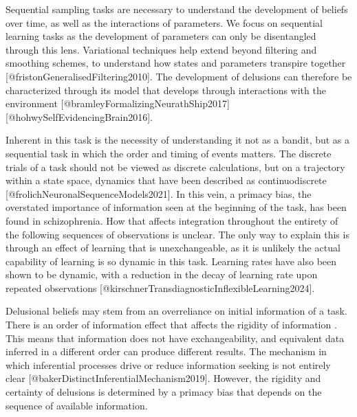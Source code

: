 \documentclass{article}
\begin{document}
Sequential sampling tasks are necessary to understand the development of beliefs over time, as well as the interactions of parameters. We focus on sequential learning tasks as the development of parameters can only be disentangled through this lens. Variational techniques help extend beyond filtering and smoothing schemes, to understand how states and parameters transpire together [@fristonGeneralisedFiltering2010]. The development of delusions can therefore be characterized through its model that develops through interactions with the environment [@bramleyFormalizingNeurathShip2017] [@hohwySelfEvidencingBrain2016].

Inherent in this task is the necessity of understanding it not as a bandit, but as a sequential task in which the order and timing of events matters. The discrete trials of a task should not be viewed as discrete calculations, but on a trajectory within a state space, dynamics that have been described as continuodiscrete [@frolichNeuronalSequenceModels2021]. In this vein, a primacy bias, the overstated importance of information seen at the beginning of the task, has been found in schizophrenia. How that affects integration throughout the entirety of the following sequences of observations is unclear. The only way to explain this is through an effect of learning that is unexchangeable, as it is unlikely the actual capability of learning is so dynamic in this task. Learning rates have also been shown to be dynamic, with a reduction in the decay of learning rate upon repeated observations [@kirschnerTransdiagnosticInflexibleLearning2024].

Delusional beliefs may stem from an overreliance on initial information of a task. There is an order of information effect that affects the rigidity of information \citep{ashinoff2022}. This means that information does not have exchangeability, and equivalent data inferred in a different order can produce different results. The mechanism in which inferential processes drive or reduce information seeking is not entirely clear [@bakerDistinctInferentialMechanism2019]. However, the rigidity and certainty of delusions is determined by a primacy bias that depends on the sequence of available information.
\end{document}
